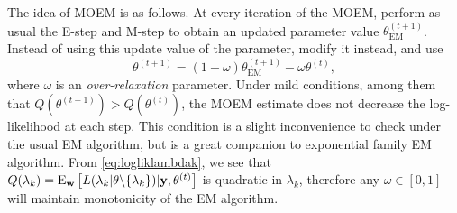 The idea of MOEM is as follows.
At every iteration of the MOEM, perform as usual the E-step and M-step to obtain an updated parameter value $\theta^{(t+1)}_\text{EM}$.
Instead of using this update value of the parameter, modify it instead, and use
\[
  \theta^{(t+1)} = (1 + \omega) \theta^{(t+1)}_\text{EM} - \omega \theta^{(t)},
\]
where $\omega$ is an \emph{over-relaxation} parameter.
Under mild conditions, among them that $Q(\theta^{(t+1)}) > Q(\theta^{(t)})$, the MOEM estimate does not decrease the log-likelihood at each step.
This condition is a slight inconvenience to check under the usual EM algorithm, but is a great companion to exponential family EM algorithm.
From \eqref{eq:logliklambdak}, we see that $Q(\lambda_k) = \operatorname{E}_{\mathbf w} \big[ L(\lambda_k|\theta\backslash\{\lambda_k \} ) | {\mathbf y},\theta^{(t)} \big]$ is quadratic in $\lambda_k$, therefore any $\omega \in [0,1]$ will maintain monotonicity of the EM algorithm.
